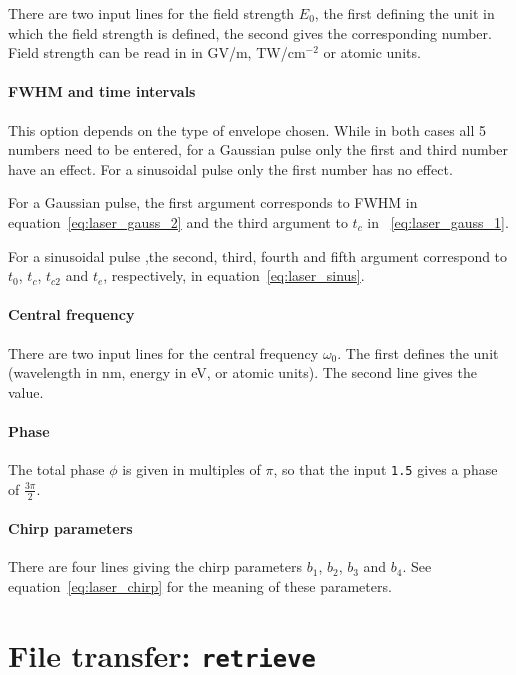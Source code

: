 \documentclass[a4paper,11pt,DIV=15,openany,twoside=false]{scrbook}
\newcommand{\ttt}[1]{\texttt{#1}}
\begin{document}
There are two input lines for the field strength $E_0$, the first defining the unit in which the field strength is defined, the second gives the corresponding number. Field strength can be read in in GV/m, TW/cm$^{-2}$ or atomic units.

\paragraph{FWHM and time intervals}

This option depends on the type of envelope chosen. While in both cases all 5 numbers need to be entered, for a Gaussian pulse only the first and third number have an effect. For a sinusoidal pulse only the first number has no effect.

For a Gaussian pulse, the first argument corresponds to FWHM in equation~\eqref{eq:laser_gauss_2} and the third argument to $t_c$ in ~\eqref{eq:laser_gauss_1}.

For a sinusoidal pulse ,the second, third, fourth and fifth argument correspond to $t_0$, $t_c$, $t_{c2}$ and $t_e$, respectively, in equation~\eqref{eq:laser_sinus}.

\paragraph{Central frequency}

There are two input lines for the central frequency $\omega_0$. The first defines the unit (wavelength in nm, energy in eV, or atomic units). The second line gives the value.

\paragraph{Phase}

The total phase $\phi$ is given in multiples of $\pi$, so that the input \ttt{1.5} gives a phase of $\frac{3\pi}{2}$.

\paragraph{Chirp parameters}

There are four lines giving the chirp parameters $b_1$, $b_2$, $b_3$ and $b_4$. See equation~\eqref{eq:laser_chirp} for the meaning of these parameters.




\section{File transfer: \ttt{retrieve}}\label{sec:retrieve}
\end{document}
